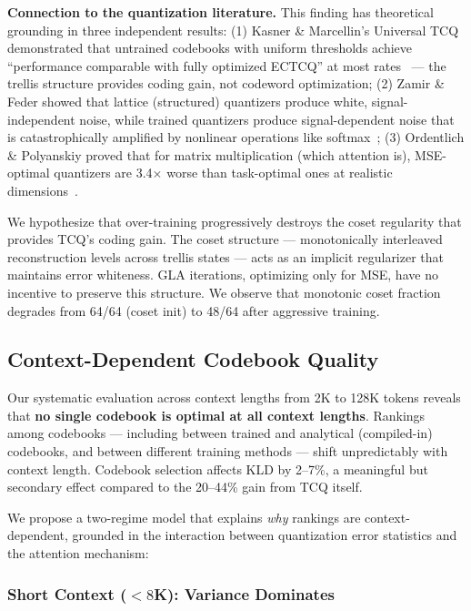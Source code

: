 \documentclass{article}
\begin{document}
\textbf{Connection to the quantization literature.} This finding has theoretical
grounding in three independent results: (1) Kasner \& Marcellin's Universal TCQ
demonstrated that untrained codebooks with uniform thresholds achieve
``performance comparable with fully optimized ECTCQ'' at most
rates~\cite{kasner1999utcq} — the trellis structure provides coding gain, not
codeword optimization; (2) Zamir \& Feder showed that lattice (structured)
quantizers produce white, signal-independent noise, while trained quantizers
produce signal-dependent noise that is catastrophically amplified by nonlinear
operations like softmax~\cite{zamir1996lattice}; (3) Ordentlich \& Polyanskiy
proved that for matrix multiplication (which attention is), MSE-optimal
quantizers are 3.4$\times$ worse than task-optimal ones at realistic
dimensions~\cite{ordentlich2024matmul}.

We hypothesize that over-training progressively destroys the coset regularity
that provides TCQ's coding gain. The coset structure — monotonically interleaved
reconstruction levels across trellis states — acts as an implicit regularizer
that maintains error whiteness. GLA iterations, optimizing only for MSE, have no
incentive to preserve this structure. We observe that monotonic coset fraction
degrades from 64/64 (coset init) to 48/64 after aggressive training.

\subsection{Context-Dependent Codebook Quality}
\label{sec:context_codebook}

Our systematic evaluation across context lengths from 2K to 128K tokens reveals
that \textbf{no single codebook is optimal at all context lengths}. Rankings
among codebooks --- including between trained and analytical (compiled-in)
codebooks, and between different training methods --- shift unpredictably with
context length. Codebook selection affects KLD by 2--7\%, a meaningful but
secondary effect compared to the 20--44\% gain from TCQ itself.

We propose a two-regime model that explains \emph{why} rankings are
context-dependent, grounded in the interaction between quantization error
statistics and the attention mechanism:

\subsubsection{Short Context ($< 8$K): Variance Dominates}
\end{document}
